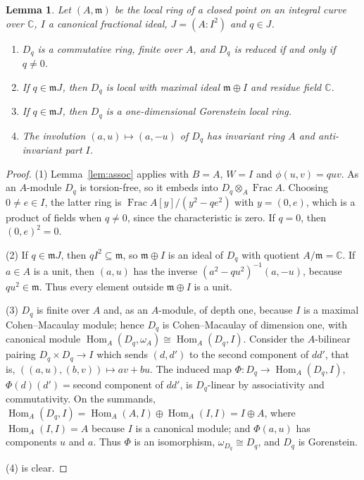 \documentclass{amsart}
\newtheorem{lemma}[theorem]{Lemma}
\theoremstyle{definition}
\theoremstyle{remark}
\numberwithin{equation}{section}
\newcommand{\C}{\mathbb{C}}
\newcommand{\m}{\mathfrak{m}}
\DeclareMathOperator{\Hom}{Hom}
\DeclareMathOperator{\Frac}{Frac}
\begin{document}
\begin{lemma}\label{lem:doubles}
Let $(A,\m)$ be the local ring of a closed point on an integral curve over $\C$, $I$ a canonical fractional ideal, $J=(A:I^2)$ and $q\in J$.
\begin{enumerate}
\item $D_q$ is a commutative ring, finite over $A$, and $D_q$ is reduced if and only if $q\ne0$.
\item If $q\in\m J$, then $D_q$ is local with maximal ideal $\m\oplus I$ and residue field $\C$.
\item If $q\in\m J$, then $D_q$ is a one-dimensional Gorenstein local ring.
\item The involution $(a,u)\mapsto(a,-u)$ of $D_q$ has invariant ring $A$ and anti-invariant part $I$.
\end{enumerate}
\end{lemma}

\begin{proof}
(1) Lemma~\ref{lem:assoc} applies with $B=A$, $W=I$ and $\phi(u,v)=quv$. As an $A$-module $D_q$ is torsion-free, so it embeds into $D_q\otimes_A\Frac A$. Choosing $0\ne e\in I$, the latter ring is $\Frac A[y]/(y^2-qe^2)$ with $y=(0,e)$, which is a product of fields when $q\neq0$, since the characteristic is zero. If $q=0$, then $(0,e)^2=0$.

(2) If $q\in\m J$, then $qI^2\subseteq\m$, so $\m\oplus I$ is an ideal of $D_q$ with quotient $A/\m=\C$. If $a\in A$ is a unit, then $(a,u)$ has the inverse $(a^2-qu^2)^{-1}(a,-u)$, because $qu^2\in\m$. Thus every element outside $\m\oplus I$ is a unit.

(3) $D_q$ is finite over $A$ and, as an $A$-module, of depth one, because $I$ is a maximal Cohen--Macaulay module; hence $D_q$ is Cohen--Macaulay of dimension one, with canonical module $\Hom_A(D_q,\omega_A)\cong\Hom_A(D_q,I)$. Consider the $A$-bilinear pairing $D_q\times D_q\to I$ which sends $(d,d')$ to the second component of $dd'$, that is, $((a,u),(b,v))\mapsto av+bu$. The induced map $\Phi\colon D_q\to\Hom_A(D_q,I)$, $\Phi(d)(d')={}$second component of $dd'$, is $D_q$-linear by associativity and commutativity. On the summands, $\Hom_A(D_q,I)=\Hom_A(A,I)\oplus\Hom_A(I,I)=I\oplus A$, where $\Hom_A(I,I)=A$ because $I$ is a canonical module; and $\Phi(a,u)$ has components $u$ and $a$. Thus $\Phi$ is an isomorphism, $\omega_{D_q}\cong D_q$, and $D_q$ is Gorenstein.

(4) is clear.
\end{proof}
\end{document}
